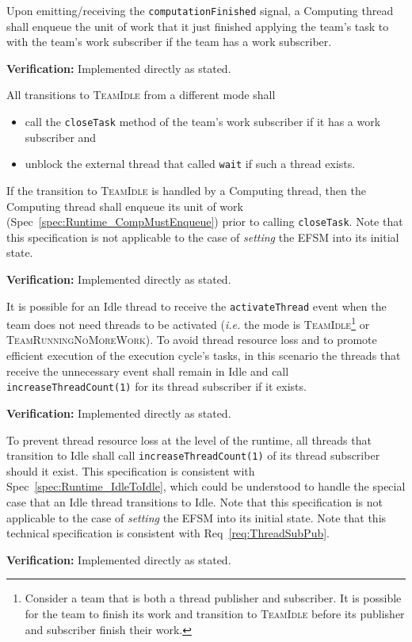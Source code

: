\documentclass{article}
\newcommand{\TeamIdle}          {\textsc{TeamIdle}}
\newcommand{\TeamRunningNoMoreWork} {\textsc{TeamRunningNoMoreWork}}
\begin{document}
\begin{spec}
\label{spec:Runtime_CompMustEnqueue}
Upon emitting/receiving the \texttt{computationFinished} signal, a Computing
thread shall enqueue the unit of work that it just finished applying the team's
task to with the team's work subscriber if the team has a work subscriber.
\end{spec}
\textbf{Verification:}\hspace{0.125in}  Implemented directly as stated.

\begin{spec}
\label{spec:Runtime_IdleOutput}
All transitions to {\TeamIdle} from a different mode shall
\begin{itemize}
\item{call the \texttt{closeTask} method of the team's work subscriber if it
has a work subscriber and }
\item{unblock the external thread that called \texttt{wait} if such a thread
exists.}
\end{itemize}
If the transition to {\TeamIdle} is handled by a Computing thread, then the
Computing thread shall enqueue its unit of work
(Spec~\ref{spec:Runtime_CompMustEnqueue}) prior to calling \texttt{closeTask}.
Note that this specification is not applicable to the case of \textit{setting}
the EFSM into its initial state.
\end{spec}
\textbf{Verification:}\hspace{0.125in}  Implemented directly as stated.

\begin{spec}
\label{spec:Runtime_IdleToIdle}
It is possible for an Idle thread to receive the \texttt{activateThread} event
when the team does not need threads to be activated (\textit{i.e.} the mode is
\TeamIdle \footnote{Consider a team that is both a thread publisher and
subscriber.  It is possible for the team to finish its work and transition to
{\TeamIdle} before its publisher and subscriber finish their work.} or
\TeamRunningNoMoreWork).  To avoid thread resource loss and to promote efficient
execution of the execution cycle's tasks, in this scenario the threads that
receive the unnecessary event shall remain in Idle and call
\texttt{increaseThreadCount(1)} for its thread subscriber if it exists.
\end{spec}
\textbf{Verification:}\hspace{0.125in} Implemented directly as stated.

\begin{spec}
\label{spec:Runtime_ForwardThreads}
To prevent thread resource loss at the level of the runtime, all threads that
transition to Idle shall call \texttt{increaseThreadCount(1)} of its thread
subscriber should it exist.  This specification is consistent with
Spec~\ref{spec:Runtime_IdleToIdle}, which could be understood to handle the
special case that an Idle thread transitions to Idle.  Note that this
specification is not applicable to the case of \textit{setting} the EFSM into
its initial state.  Note that this technical specification is consistent with
Req~\ref{req:ThreadSubPub}.
\end{spec}
\textbf{Verification:}\hspace{0.125in} Implemented directly as stated.
\end{document}
